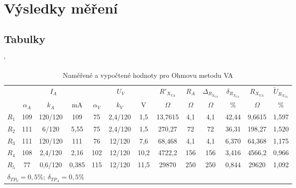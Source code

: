 \documentclass[a4paper, czech]{article}
\begin{document}
\section{Výsledky měření}

\subsection{Tabulky}

\begin{table}[H]
    \catcode`
    \centering
    \caption{Naměřené a vypočtené hodnoty pro Ohmovu metodu VA}
    \begin{tabular}{lcccccccccccc}
        \toprule
        \multirow{2}{*}{} & \multicolumn{3}{c}{$I_A$} & \multicolumn{3}{c}{$U_V$} & $R'_{X_{VA}}$ & $R_A$ & $\Delta_{R_{X_{VA}}}$ & $\delta_{R_{X_{VA}}}$ & $R_{X_{VA}}$ & $\tilde{U}_{R_{X_{VA}}}$ \\
        \cmidrule(rl){2-4}
        \cmidrule(rl){5-7}
        \cmidrule(rl){8-8}
        \cmidrule(rl){9-9}
        \cmidrule(rl){10-10}
        \cmidrule(rl){11-11}
        \cmidrule(rl){12-12}
        \cmidrule(rl){13-13}
        & $\alpha_A$   & $k_A$       & mA     & $\alpha_V$    & $k_V$       & V     & $\Omega$         & $\Omega$    & $\Omega$               & \%              & $\Omega$        & \%          \\
        \midrule
        $R_1$                & 109  & 120/120  & 109    & 75    & 2,4/120  & 1,5   & 13,7615   & 4,1  & 4,1             & 42,44           & 9,6615   & 1,597       \\
        $R_2$                & 111  & 6/120    & 5,55   & 75    & 2,4/120  & 1,5   & 270,27    & 72   & 72              & 36,31           & 198,27   & 1,520       \\
        $R_3$                & 111  & 120/120  & 111    & 76    & 12/120   & 7,6   & 68,468    & 4,1  & 4,1             & 6,370           & 64,368   & 1,175       \\
        $R_4$                & 108  & 2,4/120  & 2,16   & 102   & 12/120   & 10,2  & 4722,2    & 156  & 156             & 3,416           & 4566,2   & 0,966       \\
        $R_5$                & 77   & 0,6/120  & 0,385  & 115   & 12/120   & 11,5  & 29870     & 250  & 250             & 0,844           & 29620    & 1,092      \\
        \bottomrule
        \multicolumn{12}{l}{$\delta_{TP_V} = 0,5\%;\ \delta_{TP_A} = 0,5\%$}
    \end{tabular}
\end{table}
\end{document}
